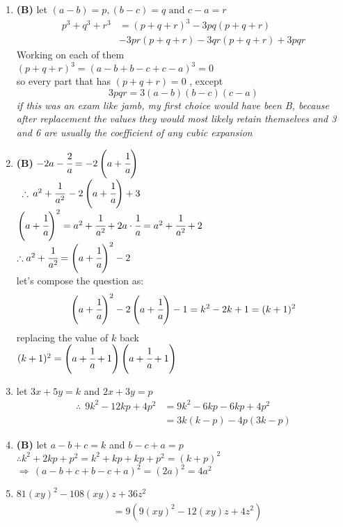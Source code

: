 \begin{multicols}{2}
\begin{enumerate}[label={\textbf{\arabic*.}}]
\item \textbf{(B)} let $(a-b) = p, (b-c) = q \text{ and } c-a = r$ \\
\begin{align*}
p^3 + q^3 + r^3 & = (p + q + r)^3 - 3pq(p + q + r) \\
& - 3pr(p+q+r) - 3qr(p + q + r) + 3pqr
\end{align*}
Working on each of them \\
$(p + q + r)^3 = (a - b + b-c + c-a)^3 = 0$ \\
so every part that has $(p + q + r) = 0 $ , except \\
$$3pqr = 3(a-b)(b-c)(c-a)$$
\textit{if this was an exam like jamb, my first choice would have been B, because after replacement the values they would most likely retain themselves and 3 and 6 are usually the coefficient of any cubic expansion }
\item \textbf{(B)} $-2a - \cfrac{2}{a} = -2\left(a+ \cfrac{1}{a}\right)$ \\
$ \hspace{5pt}\therefore \, a^2 + \cfrac{1}{a^2}  \,-2\left(a+ \cfrac{1}{a}\right) + 3$ \\
$\left(a + \cfrac{1}{a}\right)^2 = a^2 + \cfrac{1}{a^2}+ 2a\cdot\cfrac{1}{a} = a^2 + \cfrac{1}{a^2} + 2$ \\
$\therefore a^2 + \cfrac{1}{a^2} = \left(a + \cfrac{1}{a} \right)^2 - 2$ \\
let's compose the question as:
$$\left(a + \cfrac{1}{a}\right)^2 -2\left(a + \cfrac{1}{a}\right) - 1 = k^2 -2k +1 = (k+1)^2$$
replacing the value of $k$ back \\
$(k+1)^2 = \left(a+ \cfrac{1}{a} + 1\right)\left(a + \cfrac{1}{a} + 1\right)$
\item let $3x + 5y = k$ and $2x + 3y = p$
\begin{align*}
\therefore \hspace{5pt} 9k^2 -12kp + 4p^2 &= 9k^2 -6kp -6kp + 4p^2  \\
&= 3k(k-p)-4p(3k-p)
\end{align*}
\item \textbf{(B)} let $a - b + c = k $ and $b-c +a = p$ \\
$\therefore k^2 + 2kp + p^2 = k^2 + kp + kp +p^2 = (k + p)^2$ \\
$\Rightarrow \, (a - b + c  + b -c +a )^2 = (2a)^2 = 4a^2$
\item $81(xy)^2 - 108(xy)z + 36z^2$
\begin{align*}
&= 9\left(9(xy)^2 - 12(xy)z + 4z^2\right) \\

\end{align*}
\end{enumerate}
\end{multicols}
